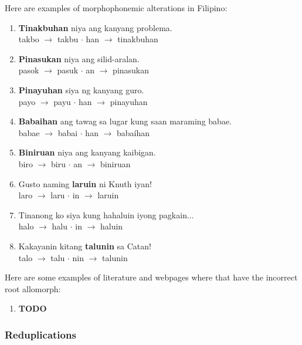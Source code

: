\begin{example}
    Here are examples of morphophonemic alterations in Filipino:
\end{example}
\begin{enumerate}
    \item \textbf{Tinakbuhan} niya ang kanyang problema. \\
          takbo \(\rightarrow\) takbu \(\cdot\) han \(\rightarrow\) tinakbuhan
    \item \textbf{Pinasukan} niya ang silid-aralan. \\
          pasok \(\rightarrow\) pasuk \(\cdot\) an \(\rightarrow\) pinasukan
    \item \textbf{Pinayuhan} siya ng kanyang guro. \\
          payo \(\rightarrow\) payu \(\cdot\) han \(\rightarrow\) pinayuhan
    \item \textbf{Babaihan} ang tawag sa lugar kung saan maraming babae. \\
          babae \(\rightarrow\) babai \(\cdot\) han \(\rightarrow\) babaíhan
    \item \textbf{Biniruan} niya ang kanyang kaibigan. \\
          biro \(\rightarrow\) biru \(\cdot\) an \(\rightarrow\) biniruan
    \item Gusto naming \textbf{laruin} ni Knuth iyan! \\
          laro  \(\rightarrow\) laru \(\cdot\) in \(\rightarrow\) laruin
    \item Tinanong ko siya kung hahaluin iyong pagkain... \\
          halo  \(\rightarrow\) halu \(\cdot\) in \(\rightarrow\) haluin
    \item Kakayanin kitang \textbf{talunin} sa Catan! \\
          talo  \(\rightarrow\) talu \(\cdot\) nin  \(\rightarrow\) talunin
\end{enumerate}


\begin{example}
    Here are some examples of literature and webpages where that have the incorrect
    root allomorph:
\end{example}
\begin{enumerate}
    \item \textbf{TODO}
\end{enumerate}

\subsubsection{Reduplications}

